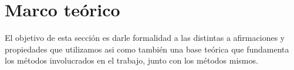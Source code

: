 \section{Marco teórico}
El objetivo de esta secci\'on es darle formalidad a las distintas a afirmaciones y propiedades que utilizamos asi como tambi\'en una base te\'orica que fundamenta los m\'etodos involucrados en el trabajo, junto con los m\'etodos mismos.
 \\
